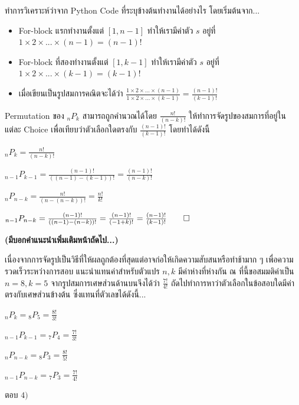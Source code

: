 \documentclass[11pt]{scrartcl}
\begin{document}
\begin{solutionbox}
  ทำการวิเคราะห์ว่าจาก Python Code ที่ระบุข้างต้นทำงานได้อย่างไร โดยเริ่มต้นจาก...
  \begin{itemize}
    \item For-block แรกทำงานตั้งแต่ $[1, n-1]$ ทำให้เรามีค่าตัว $s$ อยู่ที่ $1 \times 2 \times ... \times (n-1) = (n-1)!$
    \item For-block ที่สองทำงานตั้งแต่ $[1, k-1]$ ทำให้เรามีค่าตัว $s$ อยู่ที่ $1 \times 2 \times ... \times (k-1) = (k-1)!$
    \item เมื่อเขียนเป็นรูปสมการคณิตจะได้ว่า $\frac{1 \times 2 \times ... \times (n-1)}{1 \times 2 \times ... \times (k-1)} = \frac{(n-1)!}{(k-1)!}$
  \end{itemize}
  
  Permutation ของ ${}_nP_k$ สามารถถูกคำนวณได้โดย $\frac{n!}{(n-k)!}$ ให้ทำการจัดรูปของสมการที่อยู่ในแต่ละ Choice เพื่อเทียบว่าตัวเลือกใดตรงกับ $\frac{(n-1)!}{(k-1)!}$ โดยทำได้ดังนี้

  \begin{substmt}
    \item ${}_nP_k = \frac{n!}{(n-k)!}$
    \item ${}_{n-1}P_{k-1} = \frac{(n-1)!}{((n-1)-(k-1))!} = \frac{(n-1)!}{(n-k)!}$
    \item ${}_nP_{n-k} = \frac{n!}{(n-(n-k))!} = \frac{n!}{k!}$
    \item ${}_{n-1}P_{n-k} = \frac{(n-1)!}{((n-1)-(n-k))!} = \frac{(n-1)!}{(-1+k)!} = \frac{(n-1)!}{(k-1)!} \qed$
  \end{substmt}

  \vspace{0.5cm}
  \textbf{(มีบอกคำแนะนำเพิ่มเติมหน้าถัดไป...)}
  \newpage

  เนื่องจากการจัดรูปเป็นวิธีที่ให้ผลถูกต้องที่สุดแต่อาจก่อให้เกิดความสับสนหรือทำช้ามาก ๆ เพื่อความรวดเร็วระหว่างการสอบ แนะนำแทนค่าสำหรับตัวแปร $n, k$ มีค่าห่างที่ห่างกัน ณ ที่นี้ขอสมมติค่าเป็น $n=8, k=5$ จากรูปสมการเศษส่วนด้านบนจึงได้ว่า $\frac{7!}{4!}$ ถัดไปทำการหาว่าตัวเลือกในข้อสอบใดมีค่าตรงกับเศษส่วนข้างต้น ซึ่งแทนที่ตัวเลขได้ดังนี้...
  \begin{substmt}
    \item ${}_nP_k = {}_8P_5 = \frac{8!}{3!}$
    \item ${}_{n-1}P_{k-1} = {}_7P_4 = \frac{7!}{3!}$
    \item ${}_nP_{n-k} = {}_8P_3 = \frac{8!}{5!}$
    \item ${}_{n-1}P_{n-k} = {}_7P_3 = \frac{7!}{4!}$
  \end{substmt}

  ตอบ $\boxed{4)}$
\end{solutionbox}
\end{document}
